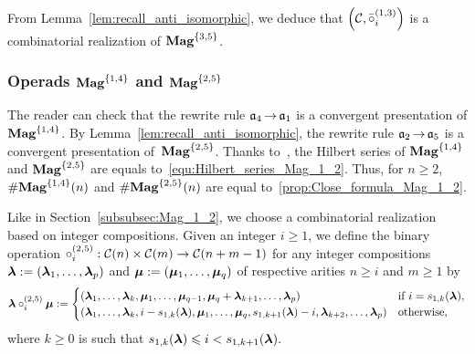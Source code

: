 From Lemma~\ref{lem:recall_anti_isomorphic}, we deduce that
$\left(\mathcal{C}, \bar{\circ}_i^{(1,3)}\right)$ is a combinatorial
realization of $\mathbf{Mag}^{\{3, 5\}}$.
\medbreak

\subsubsection{Operads $\mathbf{Mag}^{\{1, 4\}}$ and $\mathbf{Mag}^{\{2, 5\}}$}
The reader can check that the rewrite rule $\mathfrak{a}_4 \operatorname{\to} \mathfrak{a}_1$ is a
convergent presentation of $\mathbf{Mag}^{\{1, 4\}}$. By
Lemma~\ref{lem:recall_anti_isomorphic}, the rewrite rule
$\mathfrak{a}_2 \operatorname{\to} \mathfrak{a}_5$ is a convergent presentation of~$\mathbf{Mag}^{\{2, 5\}}$.
Thanks to~\cite{Gir18}, the Hilbert series of $\mathbf{Mag}^{\{1, 4\}}$ and
$\mathbf{Mag}^{\{2, 5\}}$ are equals to~\eqref{equ:Hilbert_series_Mag_1_2}. Thus,
for $n \geq 2$, $\# \mathbf{Mag}^{\{1, 4\}}(n)$ and $\# \mathbf{Mag}^{\{2, 5\}}(n)$ are
equal to~\eqref{prop:Close_formula_Mag_1_2}.
\medbreak

Like in Section~\ref{subsubsec:Mag_1_2}, we choose a combinatorial
realization based on integer compositions. Given an integer $i \geq 1$,
we define the binary operation
\begin{math}
    \circ_i^{(2,5)} : \mathcal{C}(n) \times \mathcal{C}(m)
    \to\mathcal{C}(n + m - 1)
\end{math}
for any integer compositions
$\bm{\lambda} := \left(\bm{\lambda}_1, \dots, \bm{\lambda}_p\right)$ and
$\bm{\mu} := \left(\bm{\mu}_1, \dots, \bm{\mu}_q\right)$ of respective arities
$n \geq i$ and $m \geq 1$ by
\begin{equation}
    \bm{\lambda} \circ_i^{(2,5)} \bm{\mu} :=
    \begin{cases}
        \left(\bm{\lambda}_1, \dots, \bm{\lambda}_k,
        \bm{\mu}_1, \dots, \bm{\mu}_{q-1}, \bm{\mu}_q+
        \bm{\lambda}_{k + 1}, \dots, \bm{\lambda}_p\right)
            & \mbox{if } i = s_{1, k}(\bm{\lambda}), \\
        \left(\bm{\lambda}_1, \dots, \bm{\lambda}_k,
        i - s_{1, k}(\bm{\lambda}), \bm{\mu}_1, \dots,
        \bm{\mu}_q, s_{1, k+1}(\bm{\lambda}) - i, \bm{\lambda}_{k + 2}, \dots,
        \bm{\lambda}_p
        \right)
            & \mbox{otherwise},
    \end{cases}
\end{equation}
where $k \geq 0$ is such that
\begin{math}
    s_{1, k}(\bm{\lambda}) \leqslant i < s_{1, k + 1}(\bm{\lambda}).
\end{math}
\medbreak

